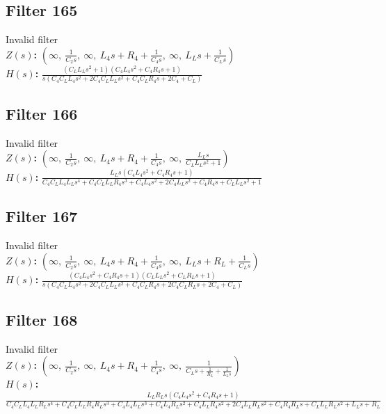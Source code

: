 \documentclass{article}
\begin{document}
\subsection*{Filter 165}
Invalid filter \\ 
\textbf{$Z(s)$:} $\left( \infty, \  \frac{1}{C_{2} s}, \  \infty, \  L_{4} s + R_{4} + \frac{1}{C_{4} s}, \  \infty, \  L_{L} s + \frac{1}{C_{L} s}\right)$ \\ 
\textbf{$H(s)$:} $\frac{\left(C_{L} L_{L} s^{2} + 1\right) \left(C_{4} L_{4} s^{2} + C_{4} R_{4} s + 1\right)}{s \left(C_{4} C_{L} L_{4} s^{2} + 2 C_{4} C_{L} L_{L} s^{2} + C_{4} C_{L} R_{4} s + 2 C_{4} + C_{L}\right)}$ \\ 
\subsection*{Filter 166}
Invalid filter \\ 
\textbf{$Z(s)$:} $\left( \infty, \  \frac{1}{C_{2} s}, \  \infty, \  L_{4} s + R_{4} + \frac{1}{C_{4} s}, \  \infty, \  \frac{L_{L} s}{C_{L} L_{L} s^{2} + 1}\right)$ \\ 
\textbf{$H(s)$:} $\frac{L_{L} s \left(C_{4} L_{4} s^{2} + C_{4} R_{4} s + 1\right)}{C_{4} C_{L} L_{4} L_{L} s^{4} + C_{4} C_{L} L_{L} R_{4} s^{3} + C_{4} L_{4} s^{2} + 2 C_{4} L_{L} s^{2} + C_{4} R_{4} s + C_{L} L_{L} s^{2} + 1}$ \\ 
\subsection*{Filter 167}
Invalid filter \\ 
\textbf{$Z(s)$:} $\left( \infty, \  \frac{1}{C_{2} s}, \  \infty, \  L_{4} s + R_{4} + \frac{1}{C_{4} s}, \  \infty, \  L_{L} s + R_{L} + \frac{1}{C_{L} s}\right)$ \\ 
\textbf{$H(s)$:} $\frac{\left(C_{4} L_{4} s^{2} + C_{4} R_{4} s + 1\right) \left(C_{L} L_{L} s^{2} + C_{L} R_{L} s + 1\right)}{s \left(C_{4} C_{L} L_{4} s^{2} + 2 C_{4} C_{L} L_{L} s^{2} + C_{4} C_{L} R_{4} s + 2 C_{4} C_{L} R_{L} s + 2 C_{4} + C_{L}\right)}$ \\ 
\subsection*{Filter 168}
Invalid filter \\ 
\textbf{$Z(s)$:} $\left( \infty, \  \frac{1}{C_{2} s}, \  \infty, \  L_{4} s + R_{4} + \frac{1}{C_{4} s}, \  \infty, \  \frac{1}{C_{L} s + \frac{1}{R_{L}} + \frac{1}{L_{L} s}}\right)$ \\ 
\textbf{$H(s)$:} $\frac{L_{L} R_{L} s \left(C_{4} L_{4} s^{2} + C_{4} R_{4} s + 1\right)}{C_{4} C_{L} L_{4} L_{L} R_{L} s^{4} + C_{4} C_{L} L_{L} R_{4} R_{L} s^{3} + C_{4} L_{4} L_{L} s^{3} + C_{4} L_{4} R_{L} s^{2} + C_{4} L_{L} R_{4} s^{2} + 2 C_{4} L_{L} R_{L} s^{2} + C_{4} R_{4} R_{L} s + C_{L} L_{L} R_{L} s^{2} + L_{L} s + R_{L}}$ \\ 
\end{document}
